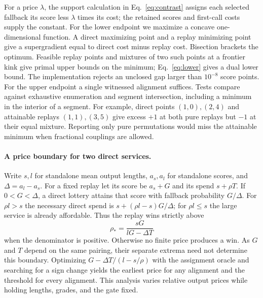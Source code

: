 For a price $\lambda$, the support calculation in Eq.~\eqref{eq:contrast} assigns each selected fallback its score less $\lambda$ times its cost; the retained scores and first-call costs supply the constant. For the lower endpoint we maximize a concave one-dimensional function. A direct maximizing point and a replay minimizing point give a supergradient equal to direct cost minus replay cost. Bisection brackets the optimum. Feasible replay points and mixtures of two such points at a frontier kink give primal upper bounds on the minimum; Eq.~\eqref{eq:lower} gives a dual lower bound. The implementation rejects an unclosed gap larger than $10^{-8}$ score points. For the upper endpoint a single witnessed alignment suffices. Tests compare against exhaustive enumeration and segment intersection, including a minimum in the interior of a segment. For example, direct points $(1,0),(2,4)$ and attainable replays $(1,1),(3,5)$ give excess $+1$ at both pure replays but $-1$ at their equal mixture. Reporting only pure permutations would miss the attainable minimum when fractional couplings are allowed.

\paragraph{A price boundary for two direct services.} Write $s,l$ for standalone mean output lengths, $a_s,a_l$ for standalone scores, and $\Delta=a_l-a_s$. For a fixed replay let its score be $a_s+G$ and its spend $s+\rho T$. If $0<G<\Delta$, a direct lottery attains that score with fallback probability $G/\Delta$. For $\rho l>s$ the necessary direct spend is $s+(\rho l-s)G/\Delta$; for $\rho l\le s$ the large service is already affordable. Thus the replay wins strictly above
\[
 \rho_*=\frac{sG}{lG-\Delta T}
\]
when the denominator is positive. Otherwise no finite price produces a win. As $G$ and $T$ depend on the same pairing, their separate extrema need not determine this boundary. Optimizing $G-\Delta T/(l-s/\rho)$ with the assignment oracle and searching for a sign change yields the earliest price for any alignment and the threshold for every alignment. This analysis varies relative output prices while holding lengths, grades, and the gate fixed.

